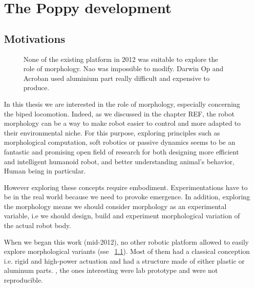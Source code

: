 
\cleartoleftpage


% 
% 

\chapter{The Poppy development} %

\section{Motivations} %

\begin{figure}[!b]
\centering
    \hfil
    \hfil
    \caption{None of the existing platform in 2012 was suitable to explore the role of morphology. Nao was impossible to modify. Darwin Op and Acroban used aluminium part really difficult and expensive to produce.}
    \label{fig:2012_Humanoids}
\end{figure}

In this thesis we are interested in the role of morphology, especially concerning the biped locomotion. Indeed, as we discussed in the chapter REF, the robot morphology can be a way to make robot easier to control and more adapted to their environmental niche. For this purpose, exploring principles such as morphological computation, soft robotics or passive dynamics seems to be an fantastic and promising open field of research for both designing more efficient and intelligent humanoid robot, and better understanding animal's behavior, Human being in particular.

However exploring these concepts require embodiment. Experimentations have to be in the real world because we need to provoke emergence. In addition, exploring the morphology means we should consider morphology as an experimental variable, i.e we should design, build and experiment morphological variation of the actual robot body.

When we began this work (mid-2012), no other robotic platform allowed to easily explore morphological variants (sse \figurename~\ref{fig:2012_Humanoids}). Most of them had a classical conception i.e. rigid and high-power actuation and had a structure made of either plastic or aluminum parts.  , the ones interesting were lab prototype and were not reproducible.

